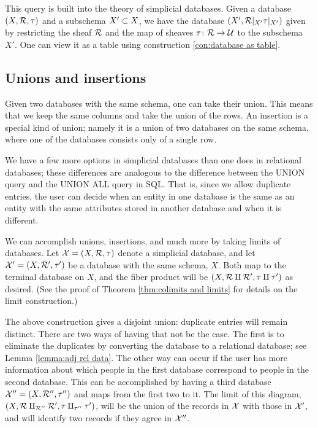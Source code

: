 \documentclass{amsart}
\begin{document}
This query is built into the theory of simplicial databases.  Given a database $(X,\mcR,\tau)$ and a subschema $X'\ss X$, we have the database $(X',\mcR|_{X'}\tau|_{X'})$ given by restricting the sheaf $\mcR$ and the map of sheaves $\tau\taking\mcR\to\mcU$ to the subschema $X'$.  One can view it as a table using construction \ref{con:database as table}.

\subsection{Unions and insertions}

Given two databases with the same schema, one can take their union.  This means that we keep the same columns and take the union of the rows.  An insertion is a special kind of union; namely it is a union of two databases on the same schema, where one of the databases consists only of a single row.

We have a few more options in simplicial databases than one does in relational databases; these differences are analogous to the difference between the UNION query and the UNION ALL query in SQL.  That is, since we allow duplicate entries, the user can decide when an entity in one database is the same as an entity with the same attributes stored in another database and when it is different.  

We can accomplish unions, insertions, and much more by taking limits of databases.  Let $\mcX=(X,\mcR,\tau)$ denote a simplicial database, and let $\mcX'=(X,\mcR',\tau')$ be a database with the same schema, $X$.  Both map to the terminal database on $X$, and the fiber product will be $(X,\mcR\amalg\mcR',\tau\amalg\tau')$ as desired.  (See the proof of Theorem \ref{thm:colimits and limits} for details on the limit construction.)

The above construction gives a disjoint union: duplicate entries will remain distinct.  There are two ways of having that not be the case.  The first is to eliminate the duplicates by converting the database to a relational database; see Lemma \ref{lemma:adj rel data}.  The other way can occur if the user has more information about which people in the first database correspond to people in the second database.  This can be accomplished by having a third database $\mcX''=(X,\mcR'',\tau'')$ and maps from the first two to it.  The limit of this diagram, $(X,\mcR\amalg_{\mcR''}\mcR',\tau\amalg_{\tau''}\tau')$, will be the union of the records in $\mcX$ with those in $\mcX'$, and will identify two records if they agree in $\mcX''$.
\end{document}
